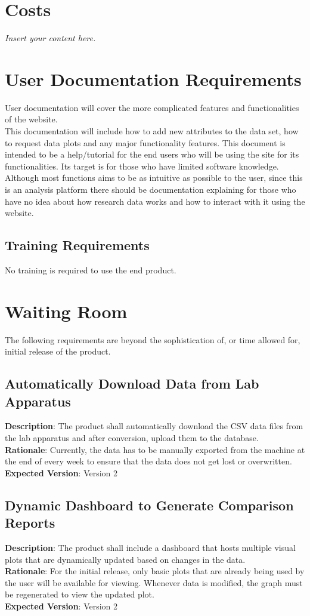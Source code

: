 \documentclass[12pt]{article}
\newcommand{\lips}{\textit{Insert your content here.}}
\begin{document}
\section{Costs}
\lips
\section{User Documentation Requirements}
User documentation will cover the more complicated features and functionalities of the website.\\

\noindent This documentation will include how to add new attributes to the data set, how
to request data plots and any major functionality features. \newline
This document is intended to be a help/tutorial for the end users who will be
using the site for its functionalities. Its target is for those who have limited
software knowledge. Although most functions aims to be as intuitive as possible
to the user, since this is an analysis platform there should be documentation
explaining for those who have no idea about how research data works and how to
interact with it using the website.

\subsection{Training Requirements}
No training is required to use the end product. 

\section{Waiting Room}
The following requirements are beyond the sophistication of, or time allowed
for, initial release of the product.
\subsection{Automatically Download Data from Lab Apparatus}
\textbf{Description}: The product shall automatically download the CSV data
files from the lab apparatus and after conversion, upload them to the
database.\\
\textbf{Rationale}: Currently, the data has to be manually exported from the
machine at the end of every week to ensure that the data does not get lost or
overwritten.\\
\textbf{Expected Version}: Version 2

\subsection{Dynamic Dashboard to Generate Comparison Reports}
\textbf{Description}: The product shall include a dashboard that hosts multiple
visual plots that are dynamically updated based on changes in the data.\\
\textbf{Rationale}: For the initial release, only basic plots that are already
being used by the user will be available for viewing. Whenever data is modified,
the graph must be regenerated to view the updated plot.\\
\textbf{Expected Version}: Version 2
\end{document}
